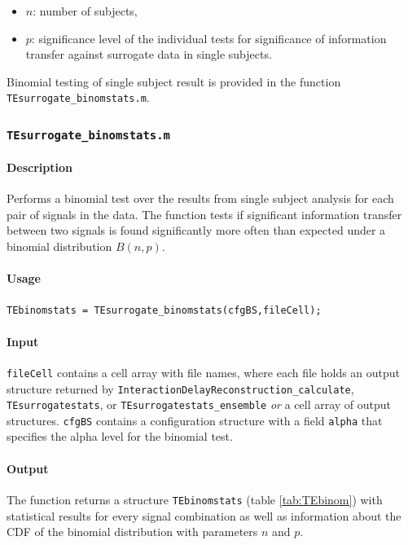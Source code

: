 \documentclass[a4paper,10pt]{article}
\begin{document}
\begin{itemize}
 \item $n$: number of subjects,
 \item $p$: significance level of the individual tests for significance of information transfer against surrogate data in single subjects.
\end{itemize}

Binomial testing of single subject result is provided in the function \texttt{TEsurrogate\_binomstats.m}.

\subsubsection{\texttt{TEsurrogate\_binomstats.m}} 

\paragraph*{Description} Performs a binomial test over the results from single subject analysis for each pair of signals in the data. The function tests if significant information transfer between two signals is found significantly more often than expected under a binomial distribution $B(n,p)$.

\paragraph*{Usage} \texttt{TEbinomstats = TEsurrogate\_binomstats(cfgBS,fileCell);}

\paragraph*{Input} \texttt{fileCell} contains a cell array with file names, where each file holds an output structure returned by \texttt{InteractionDelayReconstruction\_calculate},  \texttt{TEsurrogatestats}, or \texttt{TEsurrogatestats\_ensemble} \textit{or} a cell array of output structures. \verb&cfgBS& contains a configuration structure with a field \verb&alpha& that specifies the alpha level for the binomial test.

\paragraph*{Output} The function returns a structure \texttt{TEbinomstats} (table \ref{tab:TEbinom}) with statistical results for every signal combination as well as information about the CDF of the binomial distribution with parameters $n$ and $p$.
\end{document}
